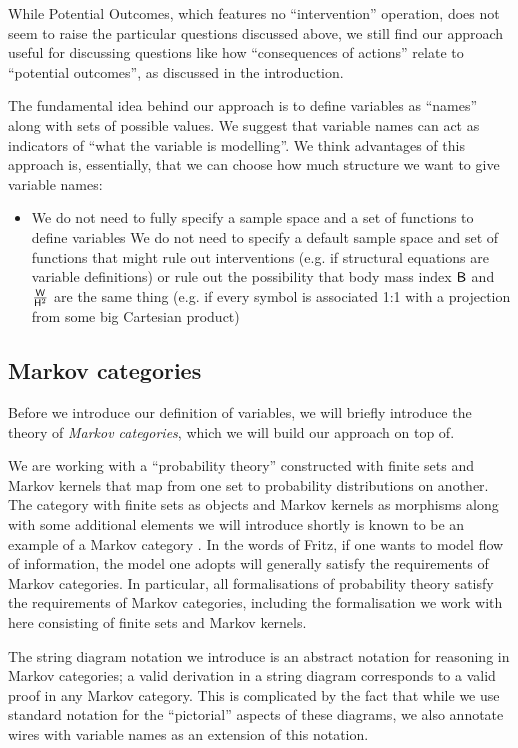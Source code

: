 While Potential Outcomes, which features no ``intervention'' operation, does not seem to raise the particular questions discussed above, we still find our approach useful for discussing questions like how ``consequences of actions'' relate to ``potential outcomes'', as discussed in the introduction.

The fundamental idea behind our approach is to define variables as ``names'' along with sets of possible values. We suggest that variable names can act as indicators of ``what the variable is modelling''. We think advantages of this approach is, essentially, that we can choose how much structure we want to give variable names:
\begin{itemize}
	\item We do not need to fully specify a sample space and a set of functions to define variables
	\itme We do not need to specify a default sample space and set of functions that might rule out interventions (e.g. if structural equations are variable definitions) or rule out the possibility that body mass index $\mathsf{B}$ and $\frac{\mathsf{W}}{\mathsf{H}^2}$ are the same thing (e.g. if every symbol is associated 1:1 with a projection from some big Cartesian product)
\end{itemize}

\subsection{Markov categories}
Before we introduce our definition of variables, we will briefly introduce the theory of \emph{Markov categories}, which we will build our approach on top of.

We are working with a ``probability theory'' constructed with finite sets and Markov kernels that map from one set to probability distributions on another. The category with finite sets as objects and Markov kernels as morphisms along with some additional elements we will introduce shortly is known to be an example of a Markov category \citep{fritz_synthetic_2020}. In the words of Fritz, if one wants to model flow of information, the model one adopts will generally satisfy the requirements of Markov categories. In particular, all formalisations of probability theory satisfy the requirements of Markov categories, including the formalisation we work with here consisting of finite sets and Markov kernels.

The string diagram notation we introduce is an abstract notation for reasoning in Markov categories; a valid derivation in a string diagram corresponds to a valid proof in any Markov category. This is complicated by the fact that while we use standard notation for the ``pictorial'' aspects of these diagrams, we also annotate wires with variable names as an extension of this notation. 

